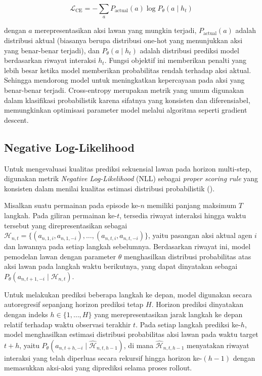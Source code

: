 \begin{equation}\label{eq:CrossEntropy}
\mathcal{L}_{\text{CE}} = - \sum_{a} P_{\text{actual}}(a) \log P_\theta(a \mid h_t)
\end{equation}

dengan $a$ merepresentasikan aksi lawan yang mungkin terjadi, $P_{\text{actual}}(a)$ adalah distribusi aktual (biasanya berupa distribusi one-hot yang menunjukkan aksi yang benar-benar terjadi), dan $P_\theta(a \mid h_t)$ adalah distribusi prediksi model berdasarkan riwayat interaksi $h_t$. Fungsi objektif ini memberikan penalti yang lebih besar ketika model memberikan probabilitas rendah terhadap aksi aktual. Sehingga mendorong model untuk meningkatkan kepercayaan pada aksi yang benar-benar terjadi. Cross-entropy merupakan metrik yang umum digunakan dalam klasifikasi probabilistik karena sifatnya yang konsisten dan diferensiabel, memungkinkan optimisasi parameter model melalui algoritma seperti gradient descent.

\subsection{Negative Log-Likelihood}\label{sec:NLL}

Untuk mengevaluasi kualitas prediksi sekuensial lawan pada horizon multi-step, digunakan metrik \textit{Negative Log-Likelihood} (NLL) sebagai \textit{proper scoring rule} yang konsisten dalam menilai kualitas estimasi distribusi probabilistik (\cite{zhu_negative_2018}). 

Misalkan suatu permainan pada episode ke-$n$ memiliki panjang maksimum $T$ langkah. Pada giliran permainan ke-$t$, tersedia riwayat interaksi hingga waktu tersebut yang direpresentasikan sebagai $\mathcal{H}_{n,t} = \{(a_{n,1,i}, a_{n,1,-i}), \dots, (a_{n,t,i}, a_{n,t,-i})\}$, yaitu pasangan aksi aktual agen $i$ dan lawannya pada setiap langkah sebelumnya. Berdasarkan riwayat ini, model pemodelan lawan dengan parameter $\theta$ menghasilkan distribusi probabilitas atas aksi lawan pada langkah waktu berikutnya, yang dapat dinyatakan sebagai $P_\theta(a_{n,t+1,-i} \mid \mathcal{H}_{n,t})$.

Untuk melakukan prediksi beberapa langkah ke depan, model digunakan secara autoregresif sepanjang horizon prediksi tetap $H$. Horizon prediksi dinyatakan dengan indeks $h \in \{1,\dots,H\}$ yang merepresentasikan jarak langkah ke depan relatif terhadap waktu observasi terakhir $t$. Pada setiap langkah prediksi ke-$h$, model menghasilkan estimasi distribusi probabilitas aksi lawan pada waktu target $t+h$, yaitu $P_\theta(a_{n,t+h,-i} \mid \hat{\mathcal{H}}_{n,t,h-1})$, di mana $\hat{\mathcal{H}}_{n,t,h-1}$ menyatakan riwayat interaksi yang telah diperluas secara rekursif hingga horizon ke-$(h-1)$ dengan memasukkan aksi-aksi yang diprediksi selama proses rollout.


